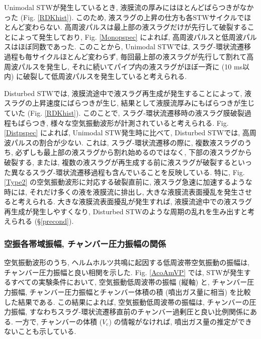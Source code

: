\documentclass[12pt]{article}
\begin{document}
Unimodal STWが発生しているとき, 液膜流の厚みにはほとんどばらつきがなかった (Fig. \ref{RDKhist}). このため, 液スラグの上昇の仕方も各STWサイクルでほとんど変わらない. 高周波パルスは最上部の液スラグだけが先行して破裂することによって発生しており, Fig. \ref{Monopspec} によれば, 高周波パルスと低周波パルスはほぼ同数であった. このことから, Unimodal STWでは, スラグ-環状流遷移過程も毎サイクルほとんど変わらず, 毎回最上部の液スラグが先行して割れて高周波パルスを発生し, それに続いてパイプ内の液スラグがほぼ一斉に (10 ms以内) に破裂して低周波パルスを発生していると考えられる.

Disturbed STWでは, 液膜流途中で液スラグ再生成が発生することによって, 液スラグの上昇速度にばらつきが生じ, 結果として液膜流厚みにもばらつきが生じていた (Fig. \ref{RDKhist}). このことで, スラグ-環状流遷移時の液スラグ膜破裂過程もばらつき, 様々な空気振動波形が計測されていると考えられる. Fig. \ref{Distpspec} によれば, Unimodal STW発生時に比べて, Disturbed STWでは, 高周波パルスの割合が少ない. これは, スラグ-環状流遷移の際に, 複数液スラグのうち, 必ずしも最上部の液スラグから割れ始めるのではなく, 下部の液スラグから破裂する, または, 複数の液スラグが再生成する前に液スラグが破裂するといった異なるスラグ-環状流遷移過程も含んでいることを反映している.
特に, Fig. \ref{Type2} の空気振動波形に対応する破裂直前に, 液スラグ急速に加速するような時には, それだけ多くの液を液膜流に排出し, 大きな液膜流表面擾乱を発生させると考えられる. 大きな液膜流表面擾乱が発生すれば, 液膜流途中での液スラグ再生成が発生しやすくなり, Disturbed STWのような周期の乱れを生み出すと考えられる (\S \ref{precond}). 


\subsubsection{空振各帯域振幅, チャンバー圧力振幅の関係}


空気振動波形のうち, ヘルムホルツ共鳴に起因する低周波帯空気振動の振幅は, チャンバー圧力振幅と良い相関を示した. Fig. \ref{AcoAmVP} では, STWが発生するすべての実験条件において, 空気振動低周波帯の振幅 (縦軸) と, チャンバー圧力振幅, チャンバー圧力振幅とチャンバー体積の積 (噴出ガス量に相当) を比較した結果である. この結果によれば, 空気振動低周波帯の振幅は, チャンバーの圧力振幅, すなわちスラグ-環状流遷移直前のチャンバー過剰圧と良い比例関係にある. 一方で, チャンバーの体積 ($V_\mathrm{c}$) の情報がなければ, 噴出ガス量の推定ができないことも示している. 
\end{document}
